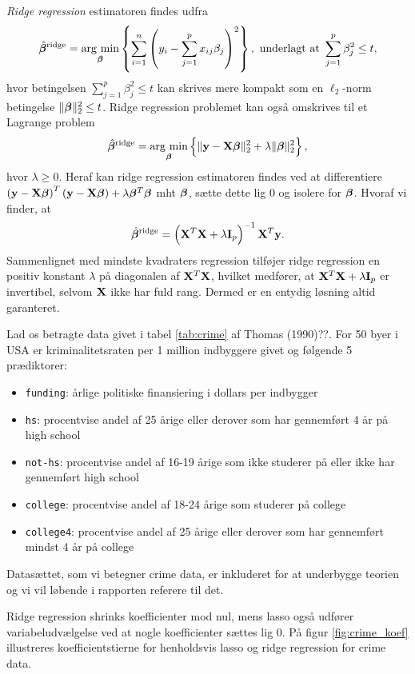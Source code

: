 \textit{Ridge regression} estimatoren findes udfra 
\begin{align} 
\hat{\tbeta}^\text{ridge} = \argmin_{\tbeta} \cbr{\sum_{i=1}^n \del{y_i - \sum_{j=1}^p x_{ij} \beta_j}^2}, \ \text{underlagt at } \sum_{j=1}^p \beta_j^2 \leq t, \label{eq:2.7} 
\end{align} 
hvor betingelsen $\sum_{j=1}^p \beta_j^2 \leq t$ kan skrives mere kompakt som en \(\ell_2\)-norm betingelse $\Vert \boldsymbol{\beta} \Vert_2^2 \leq t$.
Ridge regression problemet kan også omskrives til et Lagrange problem
\begin{align*}
\hat{\tbeta}^\text{ridge} = \argmin_{\tbeta} \cbr{ \Vert \y - \X \tbeta \Vert_2^2 + \lambda \Vert \tbeta \Vert_2^2},
\end{align*}
hvor $\lambda \geq 0$.
Heraf kan ridge regression estimatoren findes ved at differentiere \(\del{\y - \X \tbeta}^T \del{\y - \X \tbeta} + \lambda \tbeta^T \tbeta\) mht $\boldsymbol{\beta}$, sætte dette lig 0 og isolere for $\boldsymbol{\beta}$. Hvoraf vi finder, at
\begin{align} 
\hat{\tbeta}^\text{ridge} = \del{\X^T \X + \lambda \mathbf{I}_p}^{-1} \X^T \y. \label{eq:ridge_estimator}
\end{align}  
Sammenlignet med mindste kvadraters regression tilføjer ridge regression en positiv konstant $\lambda$ på diagonalen af $\mathbf{X}^T \mathbf{X}$, hvilket medfører, at \(\mathbf{X}^T \mathbf{X} + \lambda \mathbf{I}_p\) er invertibel, selvom $\mathbf{X}$ ikke har fuld rang. 
Dermed er en entydig løsning altid garanteret. 
%
\begin{exmp}
Lad os betragte data givet i tabel \ref{tab:crime} af Thomas (1990)??.
For 50 byer i USA er kriminalitetsraten per 1 million indbyggere givet og følgende 5 prædiktorer: 
\begin{itemize}
\item \texttt{funding}: årlige politiske finansiering i dollars per indbygger
\item \texttt{hs}: procentvise andel af 25 årige eller derover som har gennemført 4 år på high school
\item \texttt{not-hs}: procentvise andel af 16-19 årige som ikke studerer på eller ikke har gennemført high school
\item \texttt{college}: procentvise andel af 18-24 årige som studerer på college
\item \texttt{college4}: procentvise andel af 25 årige eller derover som har gennemført mindst 4 år på college
\end{itemize}
%

%
Datasættet, som vi betegner crime data, er inkluderet for at underbygge teorien og vi vil løbende i rapporten referere til det.
\end{exmp}
%
Ridge regression shrinks koefficienter mod nul, mens lasso også udfører variabeludvælgelse ved at nogle koefficienter sættes lig 0.
På figur \ref{fig:crime_koef} illustreres koefficientstierne for henholdsvis lasso og ridge regression for crime data.
%

